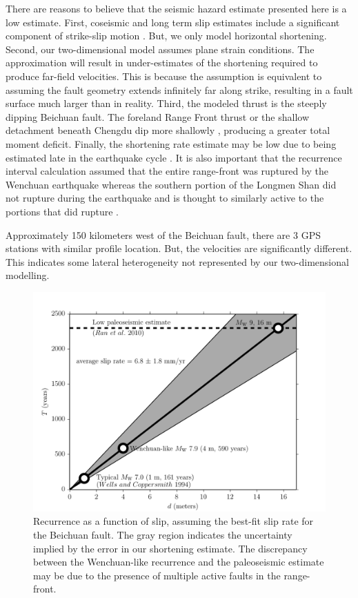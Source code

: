 \documentclass[12pt]{article}
\begin{document}
There are reasons to believe that the seismic hazard estimate presented here is a low estimate.  First, coseismic and long term slip estimates include a significant component of strike-slip motion\citep{Shen2009, Qi2011, Densmore2007} . But, we only model horizontal shortening.  Second, our two-dimensional model assumes plane strain conditions.  The approximation will result in under-estimates of the shortening required to produce far-field velocities.  This is because the assumption is equivalent to assuming the fault geometry extends infinitely far along strike, resulting in a fault surface much larger than in reality. Third, the modeled thrust is the steeply dipping Beichuan fault. The foreland Range Front thrust or the shallow detachment beneath Chengdu dip more shallowly \citep{Hubbard2010}, producing a greater total moment deficit.  Finally, the shortening rate estimate may be low due to being estimated late in the earthquake cycle \citep{savage00}.  It is also important that the recurrence interval calculation assumed that the entire range-front was ruptured by the Wenchuan earthquake whereas the southern portion of the Longmen Shan did not rupture during the earthquake and is thought to similarly active to the portions that did rupture \citep{Li2010}. 

Approximately 150 kilometers west of the Beichuan fault, there are 3 GPS stations with similar profile location. But, the velocities are significantly different. This indicates some lateral heterogeneity not represented by our two-dimensional modelling. 



\begin{figure}[h!]
    \centering
    \includegraphics{figs/hazard_all_details.pdf}
    \caption{Recurrence as a function of slip, assuming the best-fit slip rate for the Beichuan fault. The gray region indicates the uncertainty implied by the error in our shortening estimate. The discrepancy between the Wenchuan-like recurrence and the paleoseismic estimate may be due to the presence of multiple active faults in the range-front.}
    \label{fig:hazard}
\end{figure}
\end{document}
